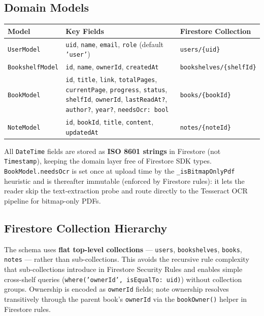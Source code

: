 \documentclass[11pt,a4paper]{article}
\begin{document}
\subsection{Domain Models}

\vspace{4pt}
\begin{tabularx}{\textwidth}{@{}L{3.2cm} L{6.4cm} L{4.0cm}@{}}
  \toprule
  \textbf{Model} & \textbf{Key Fields} & \textbf{Firestore Collection} \\
  \midrule
  \texttt{UserModel} &
    \texttt{uid}, \texttt{name}, \texttt{email}, \texttt{role} (default \texttt{'user'}) &
    \texttt{users/\{uid\}} \\
  \texttt{BookshelfModel} &
    \texttt{id}, \texttt{name}, \texttt{ownerId}, \texttt{createdAt} &
    \texttt{bookshelves/\{shelfId\}} \\
  \texttt{BookModel} &
    \texttt{id}, \texttt{title}, \texttt{link}, \texttt{totalPages}, \texttt{currentPage},
    \texttt{progress}, \texttt{status}, \texttt{shelfId}, \texttt{ownerId},
    \texttt{lastReadAt?}, \texttt{author?}, \texttt{year?}, \texttt{needsOcr: bool} &
    \texttt{books/\{bookId\}} \\
  \texttt{NoteModel} &
    \texttt{id}, \texttt{bookId}, \texttt{title}, \texttt{content}, \texttt{updatedAt} &
    \texttt{notes/\{noteId\}} \\
  \bottomrule
\end{tabularx}
\vspace{2pt}

All \texttt{DateTime} fields are stored as \textbf{ISO 8601 strings} in Firestore
(not \texttt{Timestamp}), keeping the domain layer free of Firestore SDK types.
\texttt{BookModel.needsOcr} is set once at upload time by the
\texttt{\_isBitmapOnlyPdf} heuristic and is thereafter immutable (enforced by
Firestore rules): it lets the reader skip the text-extraction probe and route
directly to the Tesseract OCR pipeline for bitmap-only PDFs.

\subsection{Firestore Collection Hierarchy}

The schema uses \textbf{flat top-level collections} — \texttt{users}, \texttt{bookshelves},
\texttt{books}, \texttt{notes} — rather than sub-collections. This avoids the recursive
rule complexity that sub-collections introduce in Firestore Security Rules and enables
simple cross-shelf queries (\texttt{where('ownerId', isEqualTo: uid)}) without collection
groups. Ownership is encoded as \texttt{ownerId} fields; note ownership resolves
transitively through the parent book's \texttt{ownerId} via the \texttt{bookOwner()}
helper in Firestore rules.
\end{document}
